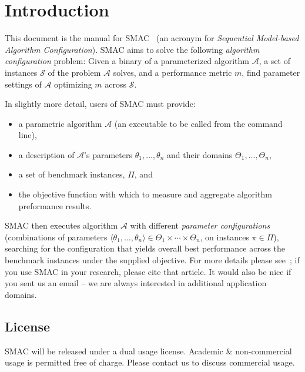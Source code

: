 \section{Introduction}\label{sec:intro}

This document is the manual for SMAC~\cite{HutHooLey11-SMAC} (an acronym for \emph{Sequential Model-based Algorithm Configuration}). SMAC aims to solve the following \emph{algorithm configuration} problem: Given a binary of a parameterized algorithm $\mathcal{A}$, a set of instances $\mathcal{S}$ of the problem $\mathcal{A}$ solves, and a performance metric $m$, find parameter settings of $\mathcal{A}$ optimizing $m$ across $\mathcal{S}$.

In slightly more detail, users of SMAC must provide:
\begin{itemize}
\item a parametric algorithm $\mathcal{A}$ (an executable to be called from
the command line), 
\item a description of $\mathcal{A}$'s parameters $\theta_1,\dots,\theta_n$ and their domains $\Theta_1, \dots, \Theta_n$, 
\item a set of benchmark instances, $\Pi$, and
\item the objective function with which to measure and aggregate algorithm preformance results.
\end{itemize}

SMAC then executes algorithm $\mathcal{A}$ with different \emph{parameter configurations} (combinations of parameters 
$\langle{}\theta_1,\dots,\theta_n\rangle{} \in \Theta_1 \times \cdots \times \Theta_n$, on instances $\pi \in \Pi$),
searching for the configuration that yields overall best performance across the benchmark instances under the supplied objective. For more details please see~\cite{HutHooLey11-SMAC}; if you use SMAC in your research, please cite that article. It would also be nice if you sent us an email -- we are always interested in additional application domains.

\subsection{License}

SMAC will be released under a dual usage license.  
Academic \& non-commercial usage is permitted free of charge. Please contact us to discuss commercial usage.

